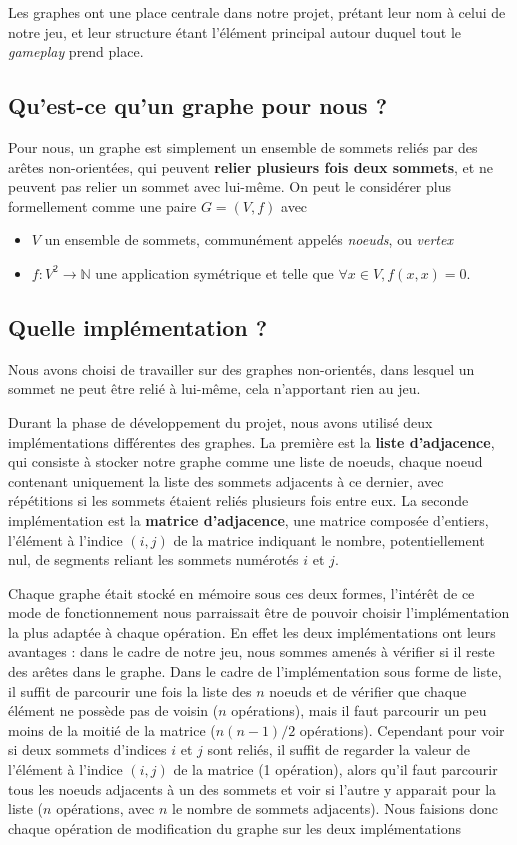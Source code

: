 \documentclass[12pt]{article}
\begin{document}
Les graphes ont une place centrale dans notre projet, prétant leur nom à celui de notre jeu, et leur structure étant l'élément principal autour duquel tout le \textit{gameplay} prend place.

\vskip 1cm

\subsection{Qu'est-ce qu'un graphe pour nous ?}
Pour nous, un graphe est simplement un ensemble de sommets reliés par des arêtes non-orientées, qui peuvent {\bf relier plusieurs fois deux sommets}, et ne peuvent pas relier un sommet avec lui-même. On peut le considérer plus formellement comme une paire $ G = (V, f) $ avec
\vskip 0.25cm
\begin{itemize}
    \item $V$ un ensemble de sommets, communément appelés \textit{noeuds}, ou \textit{vertex}
    \item $f : V^2 \rightarrow \mathbb{N} $ une application symétrique et telle que $\forall x \in V, f(x, x) = 0$.
\end{itemize}

\subsection{Quelle implémentation ?}
Nous avons choisi de travailler sur des graphes non-orientés, dans lesquel un sommet ne peut être relié à lui-même, cela n'apportant rien au jeu.

Durant la phase de développement du projet, nous avons utilisé deux implémentations différentes des graphes. La première est la {\bf liste d'adjacence}, qui consiste à stocker notre graphe comme une liste de noeuds, chaque noeud contenant uniquement la liste des sommets adjacents à ce dernier, avec répétitions si les sommets étaient reliés plusieurs fois entre eux. La seconde implémentation est la {\bf matrice d'adjacence}, une matrice composée d'entiers, l'élément à l'indice $(i,j)$ de la matrice indiquant le nombre, potentiellement nul, de segments reliant les sommets numérotés $i$ et $j$.

Chaque graphe était stocké en mémoire sous ces deux formes, l'intérêt de ce mode de fonctionnement nous parraissait être de pouvoir choisir l'implémentation la plus adaptée à chaque opération. En effet les deux implémentations ont leurs avantages : dans le cadre de notre jeu, nous sommes amenés à vérifier si il reste des arêtes dans le graphe. Dans le cadre de l'implémentation sous forme de liste, il suffit de parcourir une fois la liste des $n$ noeuds et de vérifier que chaque élément ne possède pas de voisin ($n$ opérations), mais il faut parcourir un peu moins de la moitié de la matrice ($n(n-1)/2$ opérations).
Cependant pour voir si deux sommets d'indices $i$ et $j$ sont reliés, il suffit de regarder la valeur de l'élément à l'indice $(i, j)$ de la matrice (1 opération), alors qu'il faut parcourir tous les noeuds adjacents à un des sommets et voir si l'autre y apparait pour la liste ($n$ opérations, avec $n$ le nombre de sommets adjacents). Nous faisions donc chaque opération de modification du graphe sur les deux implémentations
\end{document}
